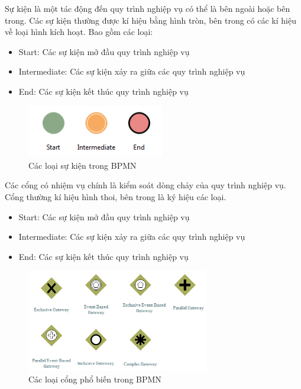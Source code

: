 Sự kiện là một tác động đến quy trình nghiệp vụ có thể là bên ngoài hoặc bên trong. Các sự kiện thường được kí hiệu bằng hình tròn, bên trong có các kí hiệu về loại hình kích hoạt. Bao gồm các loại:
\begin{itemize}
    \item Start: Các sự kiện mở đầu quy trình nghiệp vụ
    \item Intermediate: Các sự kiện xảy ra giữa các quy trình nghiệp vụ
    \item End: Các sự kiện kết thúc quy trình nghiệp vụ
\end{itemize}
\begin{figure}[!htp]
    \begin{center}
        \includegraphics[width=6cm]{img/theory/BPMN/Event.png}
    \end{center}
    \caption{Các loại sự kiện trong BPMN \cite{theoryBPMN1}}
\end{figure}


Các cổng có nhiệm vụ chính là kiểm soát dòng chảy của quy trình nghiệp vụ. Cổng thường kí hiệu hình thoi, bên trong là ký hiệu các loại.
\begin{itemize}
    \item Start: Các sự kiện mở đầu quy trình nghiệp vụ
    \item Intermediate: Các sự kiện xảy ra giữa các quy trình nghiệp vụ
    \item End: Các sự kiện kết thúc quy trình nghiệp vụ
\end{itemize}
\begin{figure}[!htp]
    \begin{center}
        \includegraphics[width=8cm]{img/theory/BPMN/Gateway.png}
    \end{center}
    \caption{Các loại cổng phổ biến trong BPMN \cite{theoryBPMN1}}
\end{figure}



